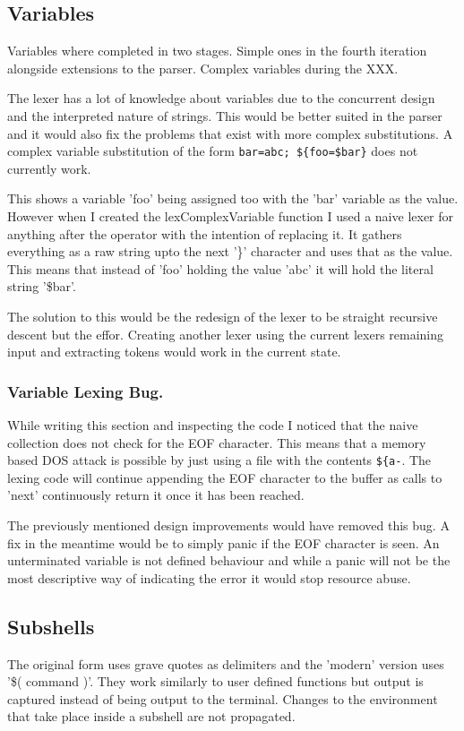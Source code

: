 \subsection{Variables}
Variables where completed in two stages.
Simple ones in the fourth iteration alongside extensions to the parser.
Complex variables during the XXX.

The lexer has a lot of knowledge about variables due to the concurrent design and the interpreted nature of strings.
This would be better suited in the parser and it would also fix the problems that exist with more complex substitutions.
A complex variable substitution of the form \verb!bar=abc; ${foo=$bar}! does not currently work.

This shows a variable 'foo' being assigned too with the 'bar' variable as the value.
However when I created the lexComplexVariable function I used a naive lexer for anything after the operator with the intention of replacing it.
It gathers everything as a raw string upto the next '\}' character and uses that as the value.
This means that instead of 'foo' holding the value 'abc' it will hold the literal string '\$bar'.

The solution to this would be the redesign of the lexer to be straight recursive descent but the effor.
Creating another lexer using the current lexers remaining input and extracting tokens would work in the current state.


\subsubsection{Variable Lexing Bug.}
While writing this section and inspecting the code I noticed that the naive collection does not check for the EOF character.
This means that a memory based DOS attack is possible by just using a file with the contents \verb!${a-!.
The lexing code will continue appending the EOF character to the buffer as calls to 'next' continuously return it once it has been reached.

The previously mentioned design improvements would have removed this bug.
A fix in the meantime would be to simply panic if the EOF character is seen.
An unterminated variable is not defined behaviour and while a panic will not be the most descriptive way of indicating the error it would stop resource abuse.

\subsection{Subshells}
The original form uses grave quotes as delimiters and the 'modern' version uses '\$( command )'.
They work similarly to user defined functions but output is captured instead of being output to the terminal.
Changes to the environment that take place inside a subshell are not propagated. 

